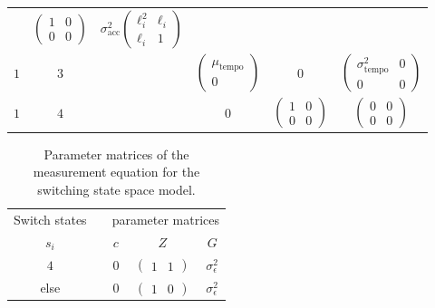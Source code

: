 \documentclass[aoas]{imsart}
\begin{document}
\begin{table}
\begin{tabular}[h!]{@{}cccccc@{}}
                                    & $\begin{pmatrix} 1 & 0 \\ 0 &
                                      0 \end{pmatrix}$ 
        & $\sigma_{\textrm{acc}}^2\begin{pmatrix} \ell_i^2 & \ell_i\\ \ell_i & 1 \end{pmatrix}$\\
  $1$ & $3$ && $\begin{pmatrix} \mu_{\textrm{tempo}}\\0\end{pmatrix}$ & 0
          & $\begin{pmatrix} \sigma^2_{\textrm{tempo}} & 0\\ 0 & 0 \end{pmatrix}$\\
  $1$ &  $4$ && 0 & $\begin{pmatrix}1&0\\0&0\end{pmatrix}$ 
        & $\begin{pmatrix}0&0\\0&0\end{pmatrix}$\\
  \bottomrule
\end{tabular}
\end{table}
%
%
\begin{table}
  \caption{Parameter matrices of the measurement equation for the switching state space model.\label{tab:parmats2}}
\centering
\begin{tabular}[b!]{@{}ccccc@{}}
\toprule
  Switch states &\phantom{a}& \multicolumn{3}{c}{parameter
                              matrices}\\
  \cmidrule{1-1} \cmidrule{3-5}
  $s_i$ && $c$ & $Z$ & $G$\\
  \midrule
  $4$  && 0 & $\begin{pmatrix} 1 & 1 \end{pmatrix}$ &
                                                                  $\sigma^2_\epsilon$\\
  else && 0 & $\begin{pmatrix} 1 & 0 \end{pmatrix}$ &
                                                                  $\sigma^2_\epsilon$\\
\bottomrule
\end{tabular}
\end{table}
\end{document}
